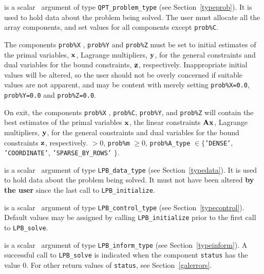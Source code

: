 \documentclass{galahad}
\newcommand{\packagename}{LPB}
\begin{document}
\begin{description}
 is a scalar \intentinout\ argument of type
{\tt QPT\_problem\_type}
(see Section~\ref{typeprob}).
It is used to hold data about the problem being solved.
The user must allocate all the array components,
and set values for all components except {\tt prob\%C}.

The components {\tt prob\%X} , {\tt prob\%Y} and {\tt prob\%Z}
must be set to initial estimates of the primal variables, ${\mathbf{x}}$,
Lagrange multipliers, ${\mathbf{y}}$, for the general constraints
and dual variables for the bound constraints, ${\mathbf{z}}$, respectively.
Inappropriate initial values will be altered, so the user should
not be overly concerned if suitable values are not apparent, and may be
content with merely setting {\tt prob\%X=0.0}, {\tt prob\%Y=0.0}
and {\tt prob\%Z=0.0}.

On exit, the components {\tt prob\%X} , {\tt prob\%C}, {\tt prob\%Y},
and {\tt prob\%Z}
will contain the best estimates of the primal variables ${\mathbf{x}}$,
the linear constraints ${\mathbf{A}} {\mathbf{x}}$,
Lagrange multipliers, ${\mathbf{y}}$, for the general constraints
and dual variables for the bound constraints ${\mathbf{z}}$, respectively.
 $> 0$, {\tt prob\%m} $\geq 0$,
 {\tt prob\%A\_type} $\in \{${\tt 'DENSE'},
 {\tt 'COORDINATE'}, {\tt 'SPARSE\_BY\_\-ROWS'} $\}$.

 is a scalar \intentinout\ argument of type
{\tt \packagename\_data\_type}
(see Section~\ref{typedata}). It is used to hold data about the problem being
solved. It must not have been altered {\bf by the user} since the last call to
{\tt \packagename\_initialize}.

 is a scalar \intentin\ argument of type
{\tt \packagename\_control\_type}
(see Section~\ref{typecontrol}). Default values may be assigned by calling
{\tt \packagename\_initialize} prior to the first call to
{\tt \packagename\_solve}.

 is a scalar \intentinout\ argument of type
{\tt \packagename\_inform\_type}
(see Section~\ref{typeinform}).
A successful call to
{\tt \packagename\_solve}
is indicated when the  component {\tt status} has the value 0.
For other return values of {\tt status}, see Section~\ref{galerrors}.


\end{description}
\end{document}

